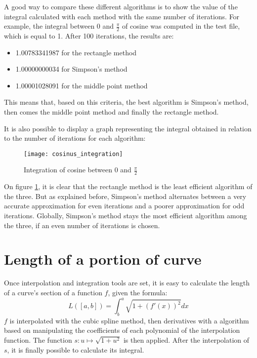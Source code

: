 \documentclass{article}
\begin{document}
A good way to compare these different algorithms is to show the value of the integral calculated with each method with the same number of iterations. For example, the integral between $0$ and $\frac{\pi}{2}$ of cosine was computed in the test file, which is equal to 1. After 100 iterations, the results are:
\begin{itemize}
\item 1.00783341987 for the rectangle method
\item 1.00000000034 for Simpson's method
\item 1.00001028091 for the middle point method
\end{itemize}
This means that, based on this criteria, the best algorithm is Simpson's method, then comes the middle point method and finally the rectangle method.

It is also possible to display a graph representing the integral obtained in relation to the number of iterations for each algorithm:

\begin{figure}[h]
  \centering
  \caption{Integration of cosine between $0$ and $\frac{\pi}{2}$}
  \texttt{[image: cosinus\_integration]}
  \label{cosinus_integration}
\end{figure}

On figure \ref{cosinus_integration}, it is clear that the rectangle method is the least efficient algorithm of the three. But as explained before, Simpson's method alternates between a very accurate approximation for even iterations and a poorer approximation for odd iterations. Globally, Simpson's method stays the most efficient algorithm among the three, if an even number of iterations is chosen.

\section{Length of a portion of curve}

Once interpolation and integration tools are set, it is easy to calculate the length of a curve's section of a function $f$, given the formula:
\begin{equation}
  L([a, b]) = \int^a_b{\sqrt{1 + (f'(x))^2} dx}
\end{equation} 
$f$ is interpolated with the cubic spline method, then derivatives with a algorithm based on manipulating the coefficients of each polynomial of the interpolation function. The function $s: u \mapsto \sqrt{1 + u^2}$ is then applied. After the interpolation of $s$, it is finally possible to calculate its integral.
\end{document}
